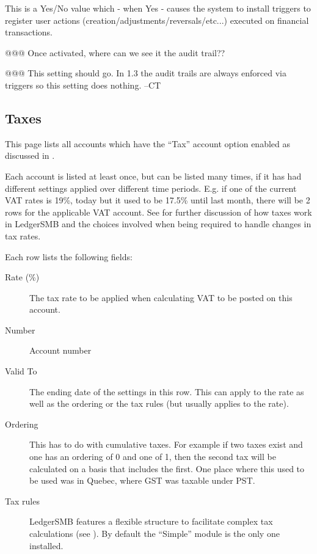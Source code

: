 This is a Yes/No value which - when Yes - causes the system to install triggers to register
user actions (creation/adjustments/reversals/etc...) executed on financial transactions.


@@@ Once activated, where can we see it the audit trail??

@@@ This setting should go.  In 1.3 the audit trails are always enforced via
triggers so this setting does nothing.  --CT

\subsection{Taxes}
\label{subsec-company-config-taxes}


This page lists all accounts which have the ``Tax'' account option enabled as discussed in .

Each account is listed at least once, but can be listed many times, if it has had different
settings applied over different time periods. E.g. if one of the current VAT rates is 19\%,
today but it used to be 17.5\% until last month, there will be 2 rows for the applicable
VAT account. See  for further discussion of how taxes work in
LedgerSMB and the choices involved when being required to handle changes in tax rates.

Each row lists the following fields:

\begin{description}
\item [Rate (\%)] The tax rate to be applied when calculating VAT to be posted on this account.
\item [Number] Account number
\item [Valid To] The ending date of the settings in this row. This can apply to the rate as well as the ordering or the tax rules (but usually applies to the rate).
\item [Ordering] This has to do with cumulative taxes.  For example if two taxes
exist and one has an ordering of 0 and one of 1, then the second tax will be
calculated on a basis that includes the first.  One place where this used to be
used was in Quebec, where GST was taxable under PST.
\item [Tax rules] LedgerSMB features a flexible structure to facilitate complex tax
calculations (see ). By default the ``Simple'' module
is the only one installed.
\end{description}

